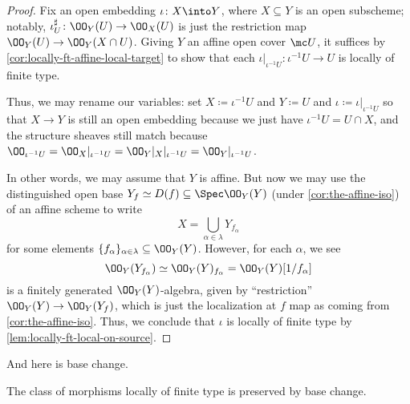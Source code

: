 \documentclass[../notes.tex]{subfiles}
\begin{document}
\begin{proof}
	Fix an open embedding $\iota\colon X\into Y$, where $X\subseteq Y$ is an open subscheme; notably, $\iota^\sharp_U\colon\OO_Y(U)\to\OO_X(U)$ is just the restriction map $\OO_Y(U)\to\OO_Y(X\cap U)$. Giving $Y$ an affine open cover $\mc U$, it suffices by \autoref{cor:locally-ft-affine-local-target} to show that each $\iota|_{\iota^{-1}U}\colon\iota^{-1}U\to U$ is locally of finite type.

	Thus, we may rename our variables: set $X\coloneqq\iota^{-1}U$ and $Y\coloneqq U$ and $\iota\coloneqq\iota|_{\iota^{-1}U}$ so that $X\to Y$ is still an open embedding because we just have $\iota^{-1}U=U\cap X$, and the structure sheaves still match because $\OO_{\iota^{-1}U}=\OO_X|_{\iota^{-1}U}=\OO_Y|_X|_{\iota^{-1}U}=\OO_Y|_{\iota^{-1}U}$.

	In other words, we may assume that $Y$ is affine. But now we may use the distinguished open base $Y_f\simeq D(f)\subseteq\Spec\OO_Y(Y)$ (under \autoref{cor:the-affine-iso}) of an affine scheme to write
	\[X=\bigcup_{\alpha\in\lambda}Y_{f_\alpha}\]
	for some elements $\{f_\alpha\}_{\alpha\in\lambda}\subseteq\OO_Y(Y)$. However, for each $\alpha$, we see
	\[\OO_Y(Y_{f_\alpha})\simeq\OO_Y(Y)_{f_\alpha}=\OO_Y(Y)[1/f_\alpha]\]
	is a finitely generated $\OO_Y(Y)$-algebra, given by ``restriction'' $\OO_Y(Y)\to\OO_Y(Y_f)$, which is just the localization at $f$ map as coming from \autoref{cor:the-affine-iso}. Thus, we conclude that $\iota$ is locally of finite type by \autoref{lem:locally-ft-local-on-source}.
\end{proof}
And here is base change.
\begin{lemma} \label{lem:locally-ft-base-change}
	The class of morphisms locally of finite type is preserved by base change.
\end{lemma}
\end{document}
